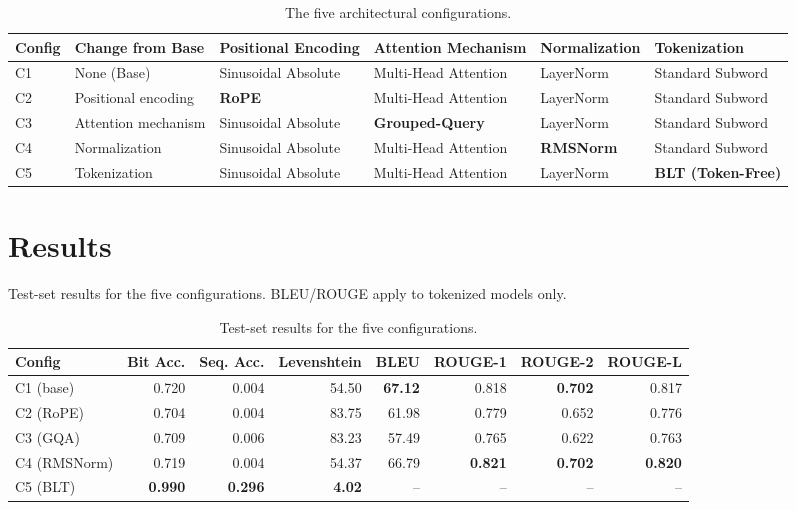 \documentclass[12pt]{article}
\begin{document}
\begin{table}[!htb]
\centering
\small
\setlength{\tabcolsep}{4pt}
\begin{tabular}{@{}lR{2.2cm}R{2.2cm}R{2.3cm}R{2.4cm}R{2.4cm}@{}}
\toprule
Config & Change from Base & Positional Encoding & Attention Mechanism &
Normalization & Tokenization \\
\midrule
C1 & None (Base) & Sinusoidal Absolute & Multi-Head Attention & LayerNorm &
Standard Subword \\
C2 & Positional encoding & \textbf{RoPE} & Multi-Head Attention & LayerNorm &
Standard Subword \\
C3 & Attention mechanism & Sinusoidal Absolute & \textbf{Grouped-Query} &
LayerNorm & Standard Subword \\
C4 & Normalization & Sinusoidal Absolute & Multi-Head Attention &
\textbf{RMSNorm} & Standard Subword \\
C5 & Tokenization & Sinusoidal Absolute & Multi-Head Attention & LayerNorm &
\textbf{BLT (Token-Free)} \\
\bottomrule
\end{tabular}
\caption{The five architectural configurations.}
\end{table}

\section{Results}

Test-set results for the five configurations. BLEU/ROUGE apply to tokenized
models only.

\begin{table}[!htb]
\centering
\small
\setlength{\tabcolsep}{5pt}
\begin{tabular}{@{}lrrrrrrr@{}}
\toprule
Config & Bit Acc. & Seq. Acc. & Levenshtein & BLEU & ROUGE-1 & ROUGE-2 &
ROUGE-L \\
\midrule
C1 (base)    & 0.720 & 0.004 & 54.50 & \textbf{67.12} & 0.818 & \textbf{0.702} & 0.817 \\
C2 (RoPE)    & 0.704 & 0.004 & 83.75 & 61.98 & 0.779 & 0.652 & 0.776 \\
C3 (GQA)     & 0.709 & 0.006 & 83.23 & 57.49 & 0.765 & 0.622 & 0.763 \\
C4 (RMSNorm) & 0.719 & 0.004 & 54.37 & 66.79 & \textbf{0.821} & \textbf{0.702} & \textbf{0.820} \\
C5 (BLT)     & \textbf{0.990} & \textbf{0.296} & \textbf{4.02} & -- & -- & -- & -- \\
\bottomrule
\end{tabular}
\caption{Test-set results for the five configurations.}
\end{table}
\end{document}
